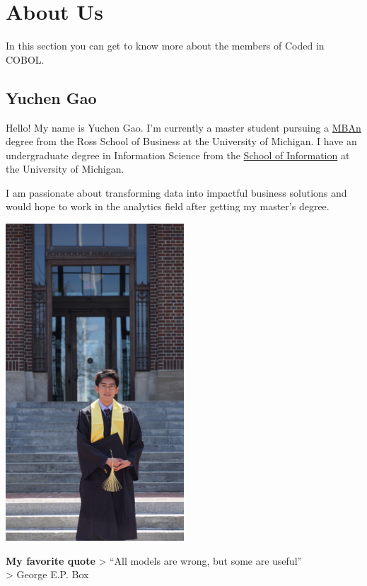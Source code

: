 \documentclass[
]{book}
\begin{document}
\hypertarget{about-us}{%
\chapter{About Us}\label{about-us}}

In this section you can get to know more about the members of Coded in COBOL.

\hypertarget{yuchen-gao}{%
\section{Yuchen Gao}\label{yuchen-gao}}

Hello! My name is Yuchen Gao. I'm currently a master student pursuing a \href{https://michiganross.umich.edu/graduate/master-of-business-analytics}{MBAn} degree from the Ross School of Business at the University of Michigan. I have an undergraduate degree in Information Science from the \href{https://www.si.umich.edu/}{School of Information} at the University of Michigan.

I am passionate about transforming data into impactful business solutions and would hope to work in the analytics field after getting my master's degree.

\includegraphics[width=0.5\textwidth,height=\textheight]{DSC00610.JPG}

\textbf{My favorite quote}
\textgreater{} ``All models are wrong, but some are useful''\\
\textgreater{} George E.P. Box
\end{document}
